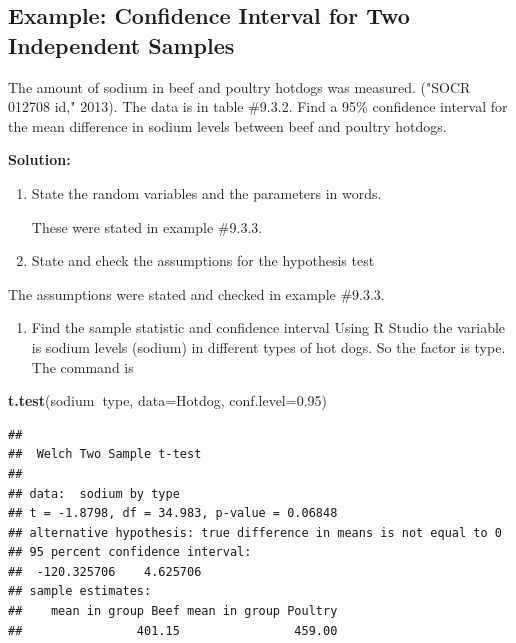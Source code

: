 \documentclass[
]{book}
\newenvironment{Shaded}{\begin{snugshade}}{\end{snugshade}}
\newcommand{\DataTypeTok}[1]{\textcolor[rgb]{0.13,0.29,0.53}{#1}}
\newcommand{\FloatTok}[1]{\textcolor[rgb]{0.00,0.00,0.81}{#1}}
\newcommand{\KeywordTok}[1]{\textcolor[rgb]{0.13,0.29,0.53}{\textbf{#1}}}
\newcommand{\NormalTok}[1]{#1}
\newcommand{\OperatorTok}[1]{\textcolor[rgb]{0.81,0.36,0.00}{\textbf{#1}}}
\providecommand{\tightlist}{%
  \setlength{\itemsep}{0pt}\setlength{\parskip}{0pt}}
\begin{document}
\hypertarget{example-confidence-interval-for-two-independent-samples}{%
\subsection{Example: Confidence Interval for Two Independent Samples}\label{example-confidence-interval-for-two-independent-samples}}

The amount of sodium in beef and poultry hotdogs was measured. ("SOCR 012708 id," 2013). The data is in table \#9.3.2. Find a 95\% confidence interval for the mean difference in sodium levels between beef and poultry hotdogs.

\textbf{Solution:}

\begin{enumerate}
\def\labelenumi{\arabic{enumi}.}
\item
  State the random variables and the parameters in words.

  These were stated in example \#9.3.3.
\item
  State and check the assumptions for the hypothesis test
\end{enumerate}

The assumptions were stated and checked in example \#9.3.3.

\begin{enumerate}
\def\labelenumi{\arabic{enumi}.}
\setcounter{enumi}{2}
\tightlist
\item
  Find the sample statistic and confidence interval
  Using R Studio the variable is sodium levels (sodium) in different types of hot dogs. So the factor is type. The command is
\end{enumerate}

\begin{Shaded}
\begin{Highlighting}[]
\KeywordTok{t.test}\NormalTok{(sodium}\OperatorTok{~}\NormalTok{type, }\DataTypeTok{data=}\NormalTok{Hotdog, }\DataTypeTok{conf.level=}\FloatTok{0.95}\NormalTok{)}
\end{Highlighting}
\end{Shaded}

\begin{verbatim}
## 
##  Welch Two Sample t-test
## 
## data:  sodium by type
## t = -1.8798, df = 34.983, p-value = 0.06848
## alternative hypothesis: true difference in means is not equal to 0
## 95 percent confidence interval:
##  -120.325706    4.625706
## sample estimates:
##    mean in group Beef mean in group Poultry 
##                401.15                459.00
\end{verbatim}
\end{document}
